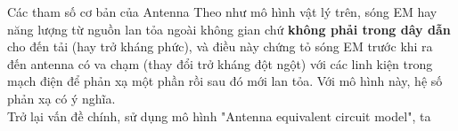 \documentclass[8pt]{beamer}
\begin{document}
\begin{frame}{Các tham số cơ bản của Antenna}
	Theo như mô hình vật lý trên, sóng EM hay năng lượng từ nguồn lan tỏa ngoài không gian chứ \textbf{không phải trong dây dẫn} cho đến tải (hay trở kháng phức), và điều này chứng tỏ sóng EM trước khi ra đến antenna có va chạm (thay đổi trở kháng đột ngột) với các linh kiện trong mạch điện để phản xạ một phần rồi sau đó mới lan tỏa. Với mô hình này, \alert{hệ số phản xạ có ý nghĩa}.
\\Trở lại vấn đề chính, sử dụng mô hình "Antenna equivalent circuit model", ta 
\end{frame}
\end{document}
